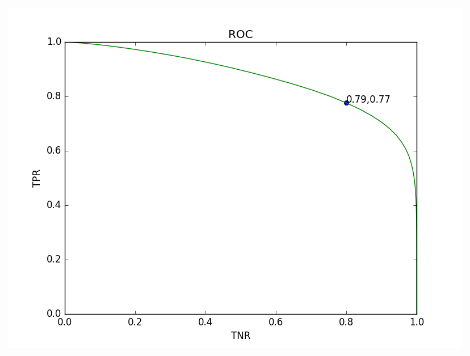 \documentclass{report}
\begin{document}
\begin{enumerate}
\begin{enumerate}[label=(\alph*)]
		\begin{center}
		\includegraphics[width=12cm]{images/ROC.png}
		\end{center}
		 

\end{enumerate}
\end{enumerate}
\end{document}
